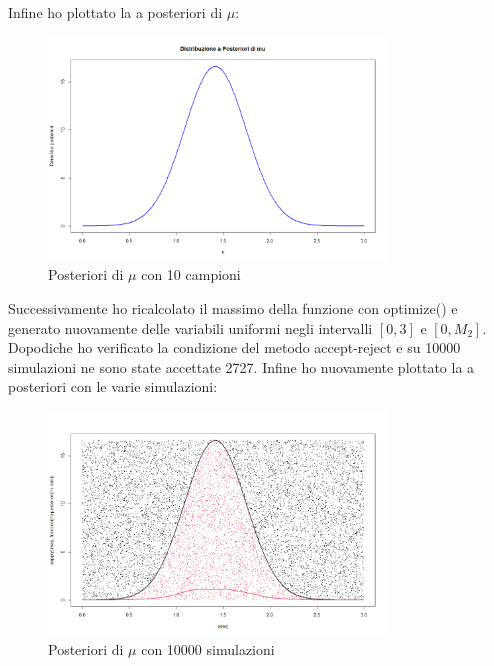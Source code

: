 \documentclass[a4paper,12pt]{article}
\begin{document}
\begin{itemize}
	Infine ho plottato la a posteriori di $\mu$:
	\begin{figure}[h] %
		\centering %
		\includegraphics[width=0.8\textwidth]{post.png} %
		\caption{Posteriori di $\mu$ con 10 campioni} %
		\label{fig:immagine} %
	\end{figure}
	\newpage
	Successivamente ho ricalcolato il massimo della funzione con optimize() e generato nuovamente delle variabili uniformi negli intervalli $[0,3]$ e $[0,M_2]$. Dopodiche ho verificato la condizione del metodo accept-reject e su 10000 simulazioni ne sono state accettate 2727. Infine ho nuovamente plottato la a posteriori con le varie simulazioni:
	\begin{figure}[h] %
		\centering %
		\includegraphics[width=0.8\textwidth]{post2.png} %
		\caption{Posteriori di $\mu$ con 10000 simulazioni} %
		\label{fig:immagine} %

\end{figure}
\end{itemize}
\end{document}
